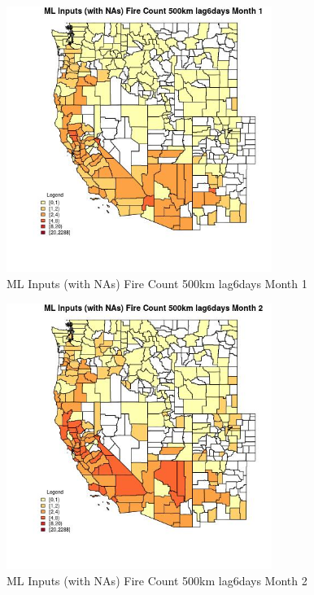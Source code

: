 \begin{figure} 
\centering  
\includegraphics[width=0.77\textwidth]{Code_Outputs/Report_ML_input_PM25_Step4_part_e_de_duplicated_aves_compiled_2019-05-20wNAs_CountyFire_Count_500km_lag6daysmedianMonth1.jpg} 
\caption{\label{fig:Report_ML_input_PM25_Step4_part_e_de_duplicated_aves_compiled_2019-05-20wNAsCountyFire_Count_500km_lag6daysmedianMonth1}ML Inputs (with NAs) Fire Count 500km lag6days Month 1} 
\end{figure} 
 

\begin{figure} 
\centering  
\includegraphics[width=0.77\textwidth]{Code_Outputs/Report_ML_input_PM25_Step4_part_e_de_duplicated_aves_compiled_2019-05-20wNAs_CountyFire_Count_500km_lag6daysmedianMonth2.jpg} 
\caption{\label{fig:Report_ML_input_PM25_Step4_part_e_de_duplicated_aves_compiled_2019-05-20wNAsCountyFire_Count_500km_lag6daysmedianMonth2}ML Inputs (with NAs) Fire Count 500km lag6days Month 2} 
\end{figure} 
 

